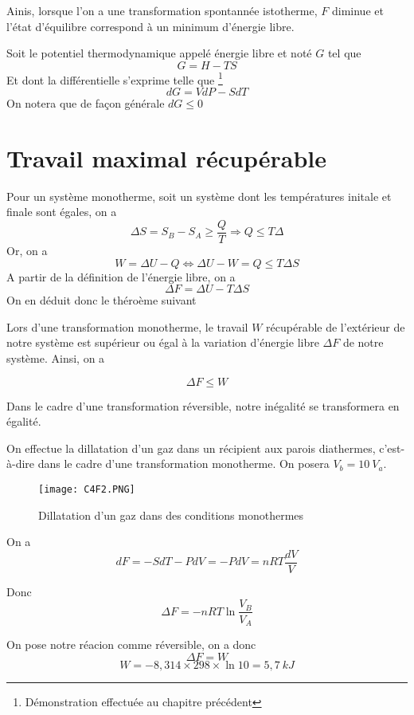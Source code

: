 Ainis, lorsque l'on a une transformation spontannée istotherme, $F$ diminue et l'état d'équilibre correspond à un minimum d'énergie libre.

\begin{definition}
Soit le potentiel thermodynamique appelé énergie libre et noté $G$ tel que 
\begin{equation}
G=H-TS
\end{equation}
Et dont la différentielle s'exprime telle que \footnote{Démonstration effectuée au chapitre précédent}
\begin{equation}
dG=VdP-SdT
\end{equation}
On notera que de façon générale $dG\leq 0$
\end{definition}

\section{Travail maximal récupérable}

Pour un système monotherme, soit un système dont les températures initale et finale sont égales, on a 
$$\Delta S = S_B-S_A \geq \frac{Q}{T} \Rightarrow Q \leq T\Delta $$
Or, on a 
$$W=\Delta U - Q \Leftrightarrow \Delta U - W = Q \leq T\Delta S$$
A partir de la définition de l'énergie libre, on a 
$$\Delta F = \Delta U - T \Delta S$$
On en déduit donc le théroème suivant 
\begin{theorem}
Lors d'une transformation monotherme, le travail $W$ récupérable de l'extérieur de notre système est supérieur ou égal à la variation d'énergie libre $\Delta F$ de notre système. Ainsi, on a 

\begin{equation}
\Delta F \leq W
\end{equation}

Dans le cadre d'une transformation réversible, notre inégalité se transformera en égalité.

\end{theorem}

\begin{example}
On effectue la dillatation d'un gaz dans un récipient aux parois diathermes, c'est-à-dire dans le cadre d'une transformation monotherme. On posera $V_b=10~V_a$.

\begin{figure}[H]
\centering
\texttt{[image: C4F2.PNG]}
\caption{Dillatation d'un gaz dans des conditions monothermes}
\end{figure}

On a 
$$dF = -SdT-PdV=-PdV = nRT\frac{dV}{V}$$

Donc
$$\Delta F = -nRT\ln\frac{V_B}{V_A}$$

On pose notre réacion comme réversible, on a donc 
$$\Delta F = W$$
$$W = -8,314 \times 298 \times \ln 10 = 5,7~kJ$$
\end{example}

